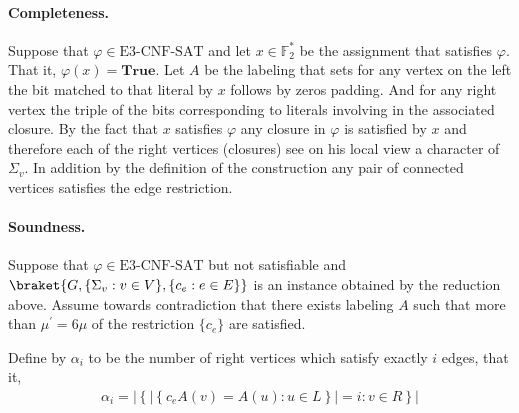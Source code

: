 \documentclass{article}
\begin{document}
%

\paragraph{Completeness. } Suppose that $\varphi \in \text{E3-CNF-SAT}$ and let $x \in \mathbb{F}_{2}^{*}$ be the assignment that satisfies $\varphi$. That it, $\varphi\left( x \right) = \mathbf{True}$. Let $A$ be the labeling that sets for any vertex on the left the bit matched to that literal by $x$ follows by zeros padding. And for any right vertex the triple of the bits corresponding to literals involving in the associated closure. By the fact that $x$ satisfies $\varphi$ any closure in $\varphi$ is satisfied by $x$ and therefore each of the right vertices (closures) see on his local view a character of $\Sigma_{v}$. In addition by the definition of the construction any pair of connected vertices satisfies the edge restriction. 

\paragraph{Soundness.} Suppose that $\varphi \in \text{E3-CNF-SAT}$ but not satisfiable and $\braket{G, \{ \Sigma_{v} : v \in V \}, \{c_{e} : e \in E \}} $ is an instance obtained by the reduction above. Assume towards contradiction that there exists labeling $A$ such that more than $\mu^{\prime}= 6\mu$ of the restriction $\{c_{e}\}$ are satisfied. 

Define by $\alpha_{i}$ to be the number of right vertices which satisfy exactly $i$ edges, that it, 
\begin{equation*}
  \begin{split}
    \alpha_{i} = \left| \left\{ | \left\{ c_{e}A\left( v \right) = A\left( u \right) : u \in L \right\} | = i : v \in R   \right\} \right| 
  \end{split}
\end{equation*}
\end{document}

